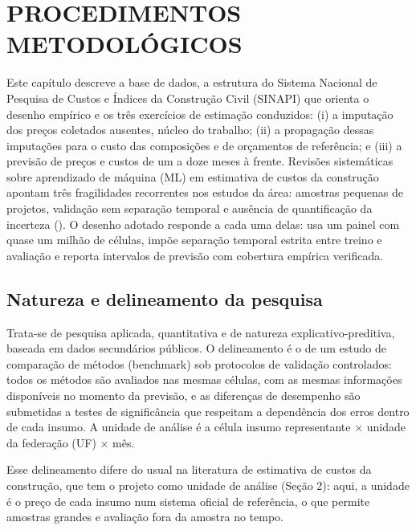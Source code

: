 
\section{PROCEDIMENTOS METODOLÓGICOS}

Este capítulo descreve a base de dados, a estrutura do Sistema Nacional de Pesquisa
de Custos e Índices da Construção Civil (SINAPI) que orienta o desenho empírico e os três
exercícios de estimação conduzidos: (i) a imputação dos preços coletados ausentes, núcleo do
trabalho; (ii) a propagação dessas imputações para o custo das composições e de orçamentos
de referência; e (iii) a previsão de preços e custos de um a doze meses à frente. Revisões
sistemáticas sobre aprendizado de máquina (ML) em estimativa de custos da construção apontam
três fragilidades recorrentes nos estudos da área: amostras pequenas de projetos, validação sem
separação temporal e ausência de quantificação da incerteza (). O desenho
adotado responde a cada uma delas: usa um painel com quase um milhão de células, impõe
separação temporal estrita entre treino e avaliação e reporta intervalos de previsão com cobertura
empírica verificada.

\subsection{Natureza e delineamento da pesquisa}

Trata-se de pesquisa aplicada, quantitativa e de natureza explicativo-preditiva, baseada
em dados secundários públicos. O delineamento é o de um estudo de comparação de métodos
(benchmark) sob protocolos de validação controlados: todos os métodos são avaliados nas mesmas
células, com as mesmas informações disponíveis no momento da previsão, e as diferenças de
desempenho são submetidas a testes de significância que respeitam a dependência dos erros
dentro de cada insumo. A unidade de análise é a célula insumo representante × unidade da
federação (UF) × mês.

Esse delineamento difere do usual na literatura de estimativa de custos da construção,
que tem o projeto como unidade de análise (Seção 2): aqui, a unidade é o preço de cada insumo
num sistema oficial de referência, o que permite amostras grandes e avaliação fora da amostra no
tempo.

